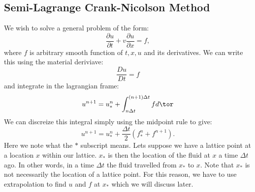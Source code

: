 \documentclass{article}
\begin{document}
\subsection*{Semi-Lagrange Crank-Nicolson Method}
We wish to solve a general problem of the form:
\begin{equation}
	\frac{\partial u}{\partial t} + v \frac{\partial u}{\partial x} = f,
\end{equation}
where $f$ is arbitrary smooth function of $t,x,u$ and its derivatives.
\newline
We can write this using the material deriviave:
\begin{equation}
	\frac{D u}{D t} = f
\end{equation}
and integrate in the lagrangian frame:
\begin{equation}
	u^{n+1} = u^{n}_{*} + \int_{n \Delta t}^{(n+1) \Delta t} f d \tor
\end{equation}
We can discreize this integral simply using the midpoint rule to give:
\begin{equation}
	u^{n+1} = u^{n}_{*} + \frac{\Delta t}{2} (f^{n}_{*} + f^{n+1}).
\end{equation}
Here we note what the $*$ subscript means. Lets suppose we have a lattice point at a location $x$ within our lattice. $x_{*}$ is then the location of the fluid at $x$ a time $\Delta t$ ago. In other words, in a time $\Delta t$ the fluid travelled 
from $x_{*}$ to $x$. Note that $x_{*}$ is not necessarily the location of a lattice point. For this reason, we have to use extrapolation to find $u$ and $f$ at $x_*$ which we will discuss later. 
\end{document}
